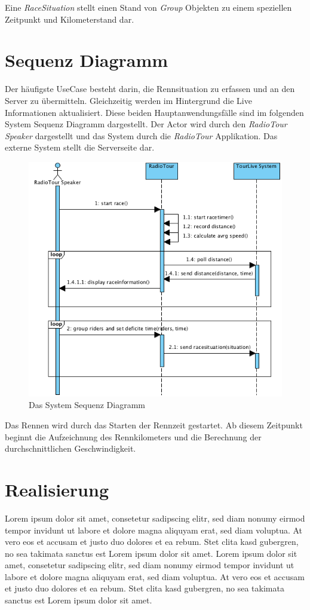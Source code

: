 Eine \textit{RaceSituation} stellt einen Stand von \textit{Group} Objekten zu einem speziellen Zeitpunkt und Kilometerstand dar.

\section{Sequenz Diagramm}
Der häufigste UseCase besteht darin, die Rennsituation zu erfassen und an den Server zu übermitteln. Gleichzeitig werden im Hintergrund die Live Informationen aktualisiert. Diese beiden Hauptanwendungsfälle sind im folgenden System Sequenz Diagramm dargestellt. Der Actor wird durch den \textit{RadioTour Speaker} dargestellt und das System durch die \textit{RadioTour} Applikation. Das externe System stellt die Serverseite dar.

\begin{figure}[h!]
\caption{Das System Sequenz Diagramm}
\label{fig:ssd_rennen}
\centering
\includegraphics{05bericht/images/ssd_rennen.png}
\end{figure} 

Das Rennen wird durch das Starten der Rennzeit gestartet. Ab diesem Zeitpunkt beginnt die Aufzeichnung des Rennkilometers und die Berechnung der durchschnittlichen Geschwindigkeit.


\section{Realisierung}
Lorem ipsum dolor sit amet, consetetur sadipscing elitr, sed diam nonumy eirmod tempor invidunt ut labore et dolore magna aliquyam erat, sed diam voluptua. At vero eos et accusam et justo duo dolores et ea rebum. Stet clita kasd gubergren, no sea takimata sanctus est Lorem ipsum dolor sit amet. Lorem ipsum dolor sit amet, consetetur sadipscing elitr, sed diam nonumy eirmod tempor invidunt ut labore et dolore magna aliquyam erat, sed diam voluptua. At vero eos et accusam et justo duo dolores et ea rebum. Stet clita kasd gubergren, no sea takimata sanctus est Lorem ipsum dolor sit amet.